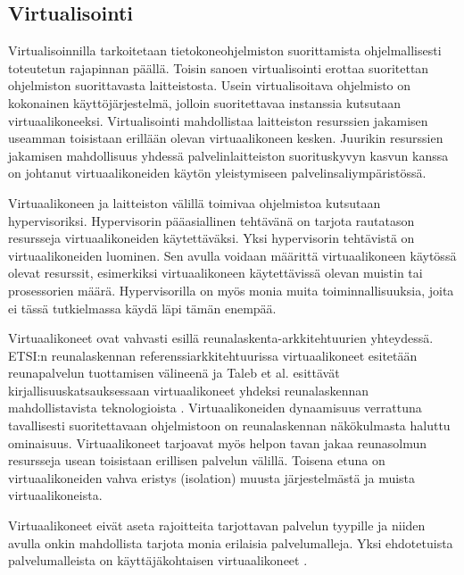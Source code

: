 \subsection{Virtualisointi}

Virtualisoinnilla tarkoitetaan tietokoneohjelmiston suorittamista ohjelmallisesti toteutetun rajapinnan päällä. 
Toisin sanoen virtualisointi erottaa suoritettan ohjelmiston suorittavasta laitteistosta.
Usein virtualisoitava ohjelmisto on kokonainen käyttöjärjestelmä, jolloin suoritettavaa instanssia kutsutaan virtuaalikoneeksi. 
Virtualisointi mahdollistaa laitteiston resurssien jakamisen useamman toisistaan erillään olevan virtuaalikoneen kesken.
Juurikin resurssien jakamisen mahdollisuus yhdessä palvelinlaitteiston suorituskyvyn kasvun kanssa on johtanut virtuaalikoneiden käytön yleistymiseen palvelinsaliympäristössä.

Virtuaalikoneen ja laitteiston välillä toimivaa ohjelmistoa kutsutaan hypervisoriksi. Hypervisorin pääasiallinen tehtävänä on tarjota rautatason resursseja virtuaalikoneiden käytettäväksi. 
Yksi hypervisorin tehtävistä on virtuaalikoneiden luominen. Sen avulla voidaan määrittä virtuaalikoneen käytössä olevat resurssit, esimerkiksi virtuaalikoneen käytettävissä olevan muistin tai prosessorien määrä. Hypervisorilla on myös monia muita toiminnallisuuksia, joita ei tässä tutkielmassa käydä läpi tämän enempää. 

Virtuaalikoneet ovat vahvasti esillä reunalaskenta-arkkitehtuurien yhteydessä. 
ETSI:n reunalaskennan referenssiarkkitehtuurissa \cite{etsirefarch} virtuaalikoneet esitetään reunapalvelun tuottamisen välineenä ja Taleb et al. esittävät kirjallisuuskatsauksessaan virtuaalikoneet yhdeksi reunalaskennan mahdollistavista teknologioista  \cite{taleb2017multi}.
Virtuaalikoneiden dynaamisuus verrattuna tavallisesti suoritettavaan ohjelmistoon on reunalaskennan näkökulmasta haluttu ominaisuus. 
Virtuaalikoneet tarjoavat myös helpon tavan jakaa reunasolmun resursseja usean toisistaan erillisen palvelun välillä.
Toisena etuna on virtuaalikoneiden vahva eristys (isolation) muusta järjestelmästä ja muista virtuaalikoneista.

Virtuaalikoneet eivät aseta rajoitteita tarjottavan palvelun tyypille ja niiden avulla onkin mahdollista tarjota monia erilaisia palvelumalleja.
Yksi ehdotetuista palvelumalleista on käyttäjäkohtaisen virtuaalikoneet \cite{satya09,wang2015mobiscud}. 

